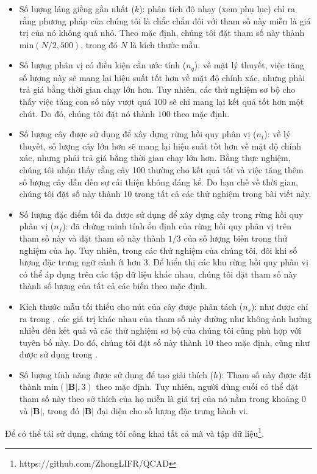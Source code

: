 \begin{itemize}
\item Số lượng láng giềng gần nhất ($k$): phân tích độ nhạy (xem phụ lục) chỉ ra rằng phương pháp của chúng tôi là chắc chắn đối với tham số này miễn là giá trị của nó không quá nhỏ. Theo mặc định, chúng tôi đặt tham số này thành $\mathrm{min}(N/2,500)$, trong đó $N$ là kích thước mẫu.

\item Số lượng phân vị có điều kiện cần ước tính ($n_q$): về mặt lý thuyết, việc tăng số lượng này sẽ mang lại hiệu suất tốt hơn về mặt độ chính xác, nhưng phải trả giá bằng thời gian chạy lớn hơn. Tuy nhiên, các thử nghiệm sơ bộ cho thấy việc tăng con số này vượt quá $100$ sẽ chỉ mang lại kết quả tốt hơn một chút. Do đó, chúng tôi đặt nó thành $100$ theo mặc định.

\item Số lượng cây được sử dụng để xây dựng rừng hồi quy phân vị ($n_t$): về lý thuyết, số lượng cây lớn hơn sẽ mang lại hiệu suất tốt hơn về mặt độ chính xác, nhưng phải trả giá bằng thời gian chạy lớn hơn. Bằng thực nghiệm, chúng tôi nhận thấy rằng cây 100 thường cho kết quả tốt và việc tăng thêm số lượng cây dẫn đến sự cải thiện không đáng kể. Do hạn chế về thời gian, chúng tôi đặt số này thành 10 trong tất cả các thử nghiệm trong bài viết này.

\item Số lượng đặc điểm tối đa được sử dụng để xây dựng cây trong rừng hồi quy phân vị ($n_f$): \cite{meinshausen2006quantile} đã chứng minh tính ổn định của rừng hồi quy phân vị trên tham số này và đặt tham số này thành $1/3$ của số lượng biến trong thử nghiệm của họ. Tuy nhiên, trong các thử nghiệm của chúng tôi, đôi khi số lượng đặc trưng ngữ cảnh ít hơn 3. Để hiển thị các khu rừng hồi quy phân vị có thể áp dụng trên các tập dữ liệu khác nhau, chúng tôi đặt tham số này thành số lượng của tất cả các biến theo mặc định.

\item Kích thước mẫu tối thiểu cho nút của cây được phân tách ($n_s$): như được chỉ ra trong \cite{meinshausen2006quantile}, các giá trị khác nhau của tham số này dường như không ảnh hưởng nhiều đến kết quả và các thử nghiệm sơ bộ của chúng tôi cũng phù hợp với tuyên bố này. Do đó, chúng tôi đặt số này thành $10$ theo mặc định, cũng như được sử dụng trong \cite{meinshausen2006quantile}.
\item Số lượng tính năng được sử dụng để tạo giải thích ($h$): Tham số này được đặt thành $\mathrm{min}(\vert \mathbf{B} \vert,3)$ theo mặc định. Tuy nhiên, người dùng cuối có thể đặt tham số này theo sở thích của họ miễn là giá trị của nó nằm trong khoảng $0$ và $\vert \mathbf{B} \vert $, trong đó
$\vert \mathbf{B} \vert $ đại diện cho số lượng đặc trưng hành vi.
\end{itemize}Để có thể tái sử dụng, chúng tôi công khai tất cả mã và tập dữ liệu\footnote{https://github.com/ZhongLIFR/QCAD}.

